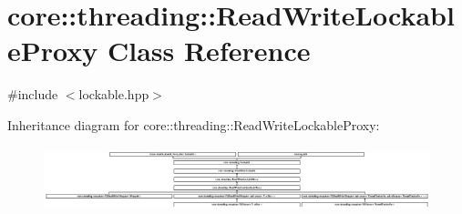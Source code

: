 \hypertarget{classcore_1_1threading_1_1_read_write_lockable_proxy}{\section{core\-:\-:threading\-:\-:Read\-Write\-Lockable\-Proxy Class Reference}
\label{classcore_1_1threading_1_1_read_write_lockable_proxy}
}


{\ttfamily \#include $<$lockable.\-hpp$>$}

Inheritance diagram for core\-:\-:threading\-:\-:Read\-Write\-Lockable\-Proxy\-:\begin{figure}[H]
\begin{center}
\leavevmode
\includegraphics[height=1.861349cm]{classcore_1_1threading_1_1_read_write_lockable_proxy}
\end{center}
\end{figure}
